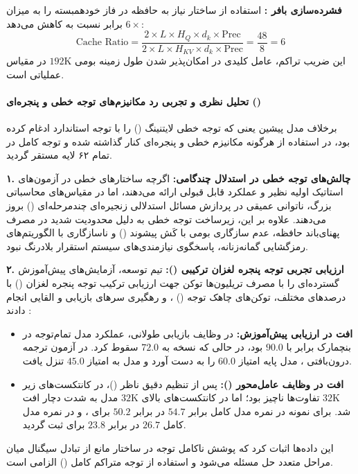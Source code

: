 \textbf{فشرده‌سازی بافر :}
استفاده از ساختار  نیاز به حافظه در فاز خودهمبسته را به میزان $6\times$ برابر نسبت به  کاهش می‌دهد:
\begin{equation}
    \text{Cache Ratio} = \frac{2 \times L \times H_Q \times d_k \times \text{Prec}}{2 \times L \times H_{KV} \times d_k \times \text{Prec}} = \frac{48}{8} = 6
\end{equation}
این ضریب تراکم، عامل کلیدی در امکان‌پذیر شدن طول زمینه بومی $192\text{K}$ در مقیاس عملیاتی است.

\paragraph*{تحلیل نظری و تجربی رد مکانیزم‌های توجه خطی و پنجره‌ای ()}
برخلاف مدل پیشین یعنی  \cite{minimax2025text01} که توجه خطی لایتنینگ () \cite{qin2024lightning} را با توجه استاندارد ادغام کرده بود، در  استفاده از هرگونه مکانیزم خطی و پنجره‌ای کنار گذاشته شده و توجه کامل در تمام ۶۲ لایه مستقر گردید.

\textbf{۱. چالش‌های توجه خطی در استدلال چندگامی:}
اگرچه ساختارهای خطی در آزمون‌های استاتیک اولیه نظیر  و  عملکرد قابل قبولی ارائه می‌دهند، اما در مقیاس‌های محاسباتی بزرگ، ناتوانی عمیقی در پردازش مسائل استدلالی زنجیره‌ای چندمرحله‌ای () بروز می‌دهند. علاوه بر این، زیرساخت توجه خطی به دلیل محدودیت شدید در مصرف پهنای‌باند حافظه، عدم سازگاری بومی با کَش پیشوند () و ناسازگاری با الگوریتم‌های رمزگشایی گمانه‌زنانه، پاسخگوی نیازمندی‌های سیستم استقرار بلادرنگ نبود.

\textbf{۲. ارزیابی تجربی توجه پنجره لغزان ترکیبی ():}
تیم توسعه، آزمایش‌های پیش‌آموزش گسترده‌ای را با مصرف تریلیون‌ها توکن جهت ارزیابی ترکیب توجه پنجره لغزان () \cite{beltagy2020longformer} با درصدهای مختلف، توکن‌های چاهک توجه () \cite{xiao2024efficient}، و رهگیری سرهای بازیابی و القایی انجام دادند \cite{olsson2022induction, wu2024retrieval}:
\begin{itemize}
    \item \textbf{افت در ارزیابی پیش‌آموزش:} در وظایف بازیابی طولانی، عملکرد مدل تمام‌توجه در بنچمارک  برابر با $90.0$ بود، در حالی که نسخه  به $72.0$ سقوط کرد. در آزمون ترجمه درون‌بافتی ، مدل پایه امتیاز $60.0$ را به دست آورد و مدل  به امتیاز $45.0$ تنزل یافت.
    \item \textbf{افت در وظایف عامل‌محور ():} پس از تنظیم دقیق ناظر ()، در کانتکست‌های زیر $32\text{K}$ تفاوت‌ها ناچیز بود؛ اما در کانتکست‌های بالای $32\text{K}$ مدل  به شدت دچار افت شد. برای نمونه در  نمره مدل کامل برابر $54.7$ در برابر $50.2$ برای ، و در  نمره مدل کامل $26.7$ در برابر $23.8$ برای  ثبت گردید.
\end{itemize}
این داده‌ها اثبات کرد که پوشش ناکامل توجه در ساختار  مانع از تبادل سیگنال میان مراحل متعدد حل مسئله می‌شود و استفاده از توجه متراکم کامل () الزامی است.

